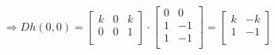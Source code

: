 \begin{eexercise}[Es 2, Provetta]
\begin{itemize}
              $$\Rightarrow D h(0,0) = \begin{bmatrix}
                k & 0 & k \\
                0 & 0 & 1 \\
              \end{bmatrix} \cdot \begin{bmatrix}
                0 & 0 \\ 
                1 & -1 \\
                1 & -1 \\
              \end{bmatrix} = \begin{bmatrix}
                k & -k \\
                1 & -1 \\
              \end{bmatrix}$$
  \end{itemize}
\end{eexercise}
